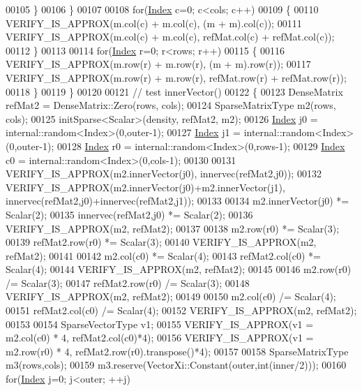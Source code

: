 \begin{DoxyCode}
00105       \}
00106     \}
00107 
00108     \textcolor{keywordflow}{for}(\hyperlink{namespace_eigen_a62e77e0933482dafde8fe197d9a2cfde}{Index} c=0; c<cols; c++)
00109     \{
00110       VERIFY\_IS\_APPROX(m.col(c) + m.col(c), (m + m).col(c));
00111       VERIFY\_IS\_APPROX(m.col(c) + m.col(c), refMat.col(c) + refMat.col(c));
00112     \}
00113 
00114     \textcolor{keywordflow}{for}(\hyperlink{namespace_eigen_a62e77e0933482dafde8fe197d9a2cfde}{Index} r=0; r<rows; r++)
00115     \{
00116       VERIFY\_IS\_APPROX(m.row(r) + m.row(r), (m + m).row(r));
00117       VERIFY\_IS\_APPROX(m.row(r) + m.row(r), refMat.row(r) + refMat.row(r));
00118     \}
00119   \}
00120 
00121   \textcolor{comment}{// test innerVector()}
00122   \{
00123     DenseMatrix refMat2 = DenseMatrix::Zero(rows, cols);
00124     SparseMatrixType m2(rows, cols);
00125     initSparse<Scalar>(density, refMat2, m2);
00126     \hyperlink{namespace_eigen_a62e77e0933482dafde8fe197d9a2cfde}{Index} j0 = internal::random<Index>(0,outer-1);
00127     \hyperlink{namespace_eigen_a62e77e0933482dafde8fe197d9a2cfde}{Index} j1 = internal::random<Index>(0,outer-1);
00128     \hyperlink{namespace_eigen_a62e77e0933482dafde8fe197d9a2cfde}{Index} r0 = internal::random<Index>(0,rows-1);
00129     \hyperlink{namespace_eigen_a62e77e0933482dafde8fe197d9a2cfde}{Index} c0 = internal::random<Index>(0,cols-1);
00130 
00131     VERIFY\_IS\_APPROX(m2.innerVector(j0), innervec(refMat2,j0));
00132     VERIFY\_IS\_APPROX(m2.innerVector(j0)+m2.innerVector(j1), innervec(refMat2,j0)+innervec(refMat2,j1));
00133 
00134     m2.innerVector(j0) *= Scalar(2);
00135     innervec(refMat2,j0) *= Scalar(2);
00136     VERIFY\_IS\_APPROX(m2, refMat2);
00137 
00138     m2.row(r0) *= Scalar(3);
00139     refMat2.row(r0) *= Scalar(3);
00140     VERIFY\_IS\_APPROX(m2, refMat2);
00141 
00142     m2.col(c0) *= Scalar(4);
00143     refMat2.col(c0) *= Scalar(4);
00144     VERIFY\_IS\_APPROX(m2, refMat2);
00145 
00146     m2.row(r0) /= Scalar(3);
00147     refMat2.row(r0) /= Scalar(3);
00148     VERIFY\_IS\_APPROX(m2, refMat2);
00149 
00150     m2.col(c0) /= Scalar(4);
00151     refMat2.col(c0) /= Scalar(4);
00152     VERIFY\_IS\_APPROX(m2, refMat2);
00153 
00154     SparseVectorType v1;
00155     VERIFY\_IS\_APPROX(v1 = m2.col(c0) * 4, refMat2.col(c0)*4);
00156     VERIFY\_IS\_APPROX(v1 = m2.row(r0) * 4, refMat2.row(r0).transpose()*4);
00157 
00158     SparseMatrixType m3(rows,cols);
00159     m3.reserve(VectorXi::Constant(outer,\textcolor{keywordtype}{int}(inner/2)));
00160     \textcolor{keywordflow}{for}(\hyperlink{namespace_eigen_a62e77e0933482dafde8fe197d9a2cfde}{Index} j=0; j<outer; ++j)

\end{DoxyCode}
